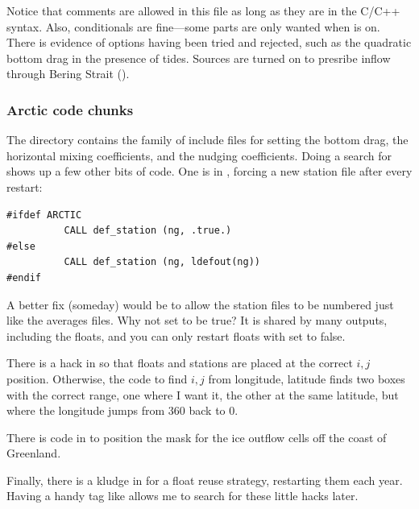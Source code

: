Notice that comments are allowed in this file as long as they are in
the C/C++ syntax. Also, conditionals are fine---some parts are only
wanted when  is on. There is evidence of options
having been tried and rejected, such as the quadratic bottom drag
in the presence of tides.
Sources are turned on to presribe inflow through Bering Strait
().

\subsubsection{Arctic code chunks}
The  directory contains the 
family of include files for setting the bottom drag, the horizontal
mixing coefficients, and the nudging coefficients.
Doing a search for  shows up a few other bits of code. One
is in , forcing a new station file after every
restart:
\begin{verbatim}
#ifdef ARCTIC
          CALL def_station (ng, .true.)
#else
          CALL def_station (ng, ldefout(ng))
#endif
\end{verbatim}
A better fix (someday) would be to allow the station files to be
numbered just like the averages files. Why not set  to
be true? It is shared by many outputs, including the floats, and you
can only restart floats with  set to false.

There is a hack in  so that floats and stations
are placed at the correct $i,j$ position. Otherwise, the code to
find $i,j$ from longitude, latitude finds two boxes with the correct
range, one where I want it, the other at the same latitude, but
where the longitude jumps from 360 back to 0.

There is code in  to position the mask for
the ice outflow cells off the coast of Greenland.

Finally, there is a kludge in  for a
float reuse strategy, restarting them each year. Having a handy tag like
 allows me to search for these little hacks later.

